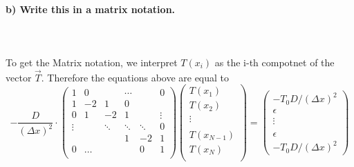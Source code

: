 \paragraph{
    b) Write this in a matrix notation.
} \ \\
    \\
    To get the Matrix notation, we interpret $T(x_i)$ as the i-th compotnet of the vector $\vec{T}$. Therefore the equations above are equal to
    \begin{equation}
    -\frac{D}{(\Delta x)^2} \cdot
    \begin{pmatrix}
    1     & 0     &        &\cdots &       & 0 \\
    1     &-2     & 1      & 0     &       &   \\
    0     & 1     & -2     & 1     &       &\vdots \\
    \vdots&       &\ddots  &\ddots & \ddots&  0\\
          &       &        &    1  &  -2   & 1 \\
    0     & \dots &        &      &   0   &1    \\
    \end{pmatrix}
    \begin{pmatrix}
    T(x_1) \\
    T(x_2)\\
    \vdots \\
    \\
    T(x_{N-1})\\
    T(x_N) \\
    \end{pmatrix}
     =
     \begin{pmatrix}
     -T_0D/(\Delta x)^2 \\
     \epsilon \\
     \vdots \\
     \\
     \epsilon \\
     -T_0D/(\Delta x)^2
     \end{pmatrix}
    \end{equation}


